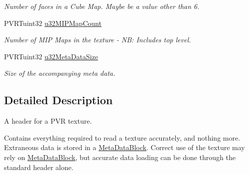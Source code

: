 \begin{DoxyCompactItemize}
\begin{DoxyCompactList}\small\item\em Number of faces in a Cube Map. Maybe be a value other than 6. \end{DoxyCompactList}\item 
\hypertarget{struct_p_v_r_texture_header_v3_aeff85edfb111086b73841c27c8b73254}{P\+V\+R\+Tuint32 \hyperlink{struct_p_v_r_texture_header_v3_aeff85edfb111086b73841c27c8b73254}{u32\+M\+I\+P\+Map\+Count}}\label{struct_p_v_r_texture_header_v3_aeff85edfb111086b73841c27c8b73254}

\begin{DoxyCompactList}\small\item\em Number of M\+I\+P Maps in the texture -\/ N\+B\+: Includes top level. \end{DoxyCompactList}\item 
\hypertarget{struct_p_v_r_texture_header_v3_a7ad0ccf7b3d539b6a39a14249cf39cc3}{P\+V\+R\+Tuint32 \hyperlink{struct_p_v_r_texture_header_v3_a7ad0ccf7b3d539b6a39a14249cf39cc3}{u32\+Meta\+Data\+Size}}\label{struct_p_v_r_texture_header_v3_a7ad0ccf7b3d539b6a39a14249cf39cc3}

\begin{DoxyCompactList}\small\item\em Size of the accompanying meta data. \end{DoxyCompactList}\end{DoxyCompactItemize}


\subsection{Detailed Description}
A header for a P\+V\+R texture. 





Contains everything required to read a texture accurately, and nothing more. Extraneous data is stored in a \hyperlink{struct_meta_data_block}{Meta\+Data\+Block}. Correct use of the texture may rely on \hyperlink{struct_meta_data_block}{Meta\+Data\+Block}, but accurate data loading can be done through the standard header alone. 

